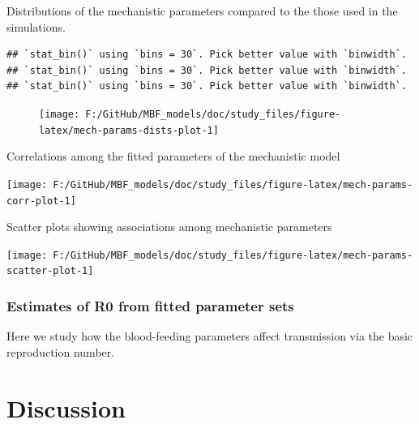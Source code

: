 \documentclass[
]{article}
\begin{document}
Distributions of the mechanistic parameters compared to the those used
in the simulations.

\begin{verbatim}
## `stat_bin()` using `bins = 30`. Pick better value with `binwidth`.
## `stat_bin()` using `bins = 30`. Pick better value with `binwidth`.
## `stat_bin()` using `bins = 30`. Pick better value with `binwidth`.
\end{verbatim}

\begin{figure}[H]
\texttt{[image: F:/GitHub/MBF\_models/doc/study\_files/figure-latex/mech-params-dists-plot-1]} \end{figure}

Correlations among the fitted parameters of the mechanistic model

\texttt{[image: F:/GitHub/MBF\_models/doc/study\_files/figure-latex/mech-params-corr-plot-1]}

Scatter plots showing associations among mechanistic parameters

\texttt{[image: F:/GitHub/MBF\_models/doc/study\_files/figure-latex/mech-params-scatter-plot-1]}

\subsubsection{Estimates of R0 from fitted parameter
sets}\label{estimates-of-r0-from-fitted-parameter-sets}

Here we study how the blood-feeding parameters affect transmission via
the basic reproduction number.

\section{Discussion}\label{discussion}
\end{document}
